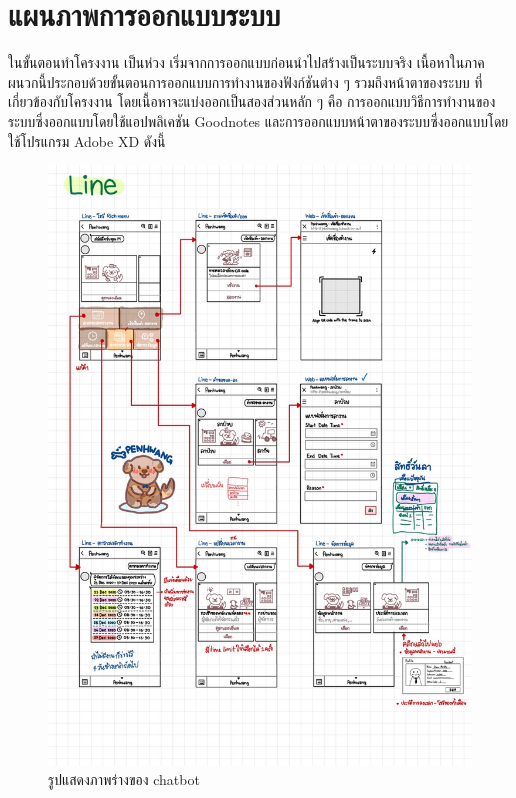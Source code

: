 \chapter{แผนภาพการออกแบบระบบ}

ในขั้นตอนทำโครงงาน เป็นห่วง เริ่มจากการออกแบบก่อนนำไปสร้างเป็นระบบจริง เนื้อหาในภาคผนวกนี้ประกอบด้วยขั้นตอนการออกแบบการทำงานของฟังก์ชันต่าง ๆ รวมถึงหน้าตาของระบบ ที่เกี่ยวข้องกับโครงงาน 
โดยเนื้อหาจะแบ่งออกเป็นสองส่วนหลัก ๆ คือ 
การออกแบบวิธีการทำงานของระบบซึ่งออกแบบโดยใช้แอปพลิเคชัน Goodnotes และการออกแบบหน้าตาของระบบซึ่งออกแบบโดยใช้โปรแกรม Adobe XD ดังนี้
\begin{figure}
  \begin{center}
    \includegraphics[width=\linewidth]{./images/design1.jpg}
  \end{center}
  \caption[รูปแสดงภาพร่างของ chatbot]{รูปแสดงภาพร่างของ chatbot} 
\end{figure}

